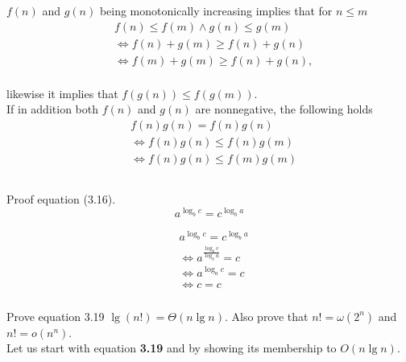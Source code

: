 \documentclass[11pt]{article}
\numberwithin{equation}{section}
\renewcommand{\iff}{\Leftrightarrow}
\begin{document}
$f(n)$ and $g(n)$ being monotonically increasing implies that for $n \leq m$ 
\begin{equation*}
    \begin{split}
        & f(n) \leq f(m) \land g(n) \leq g(m)\\
        & \iff f(n) + g(m) \geq f(n) + g(n)\\
        & \iff f(m) + g(m) \geq f(n) + g(n),\\
    \end{split}
\end{equation*}

likewise it implies that $f(g(n)) \leq f(g(m))$.\\
If in addition both $f(n)$ and $g(n)$ are nonnegative, 
the following holds
\begin{equation*}
    \begin{split}
        & f(n)g(n) = f(n)g(n)\\
        & \iff f(n)g(n) \leq f(n)g(m)\\
        & \iff f(n)g(n) \leq f(m)g(m)\\
    \end{split}
\end{equation*}

\subsubsection{}
Proof equation (3.16).
\begin{equation}\tag{3.16}
    a^{\log_b c} = c^{\log_b a}
\end{equation}

\[
    \begin{split}
        & a^{\log_b c} = c^{\log_b a}             \\
        & \iff a^{\frac{\log_b c}{ \log_b a}} = c \\
        & \iff a^{\log_a c} = c                   \\
        & \iff c = c
    \end{split}
\]

\subsubsection{}
Prove equation 3.19 $\lg(n!) = \Theta(n \lg n)$. Also prove that
$n! = \omega(2^n)$ and $n! = o(n^n)$.\\

Let us start with equation \textbf{3.19} and by showing its membership
to $O(n \lg n)$.
\end{document}
